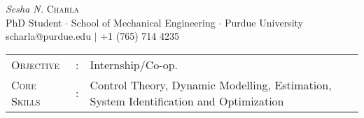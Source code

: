 \documentclass[letterpaper,10pt]{article}
\begin{document}
\begin{center}
\thispagestyle{empty}
\huge{\textit{Sesha N.} \textsc{Charla}}\\
\small PhD Student $\cdot$ School of Mechanical Engineering $\cdot$ Purdue University\\
\small scharla@purdue.edu $\mid$ +1 (765) 714 4235   \\
\end{center}


\begin{tabular}{l c l}
    {\large{\textsc{Objective}}}&:& Internship$/$Co-op.\\
{\large{\textsc{Core Skills}}}&:& Control Theory, Dynamic Modelling, Estimation,
System Identification and Optimization\\
\end{tabular}

\end{document}
